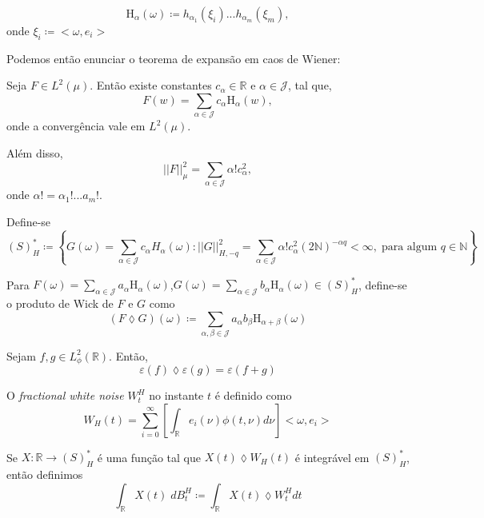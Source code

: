 \documentclass{article}
\begin{document}
$$\text{H}_\alpha(\omega) \coloneq h_{\alpha_1}(\xi_i)...h_{\alpha_m}(\xi_m),$$
onde $\xi_i \coloneq <\omega,e_i>$

\vspace{0.2cm}

Podemos então enunciar o teorema de expansão em caos de Wiener: 

\begin{thm}
    Seja $F \in L^2(\mu)$. Então existe constantes $c_\alpha \in \mathbb{R}$ e $\alpha \in \mathcal{J}$, tal que,
    $$F(w)=\sum_{\alpha \in \mathcal{J}}c_\alpha \text{H}_\alpha(w),$$
    onde a convergência vale em $L^2(\mu)$.
    
    \vspace{0.3cm}
    
    Além disso,
    $$||F||^2_\mu=\sum_{\alpha \in \mathcal{J}}\alpha!c_\alpha^2,$$
    onde $\alpha!=\alpha_1!...a_m!$.
\end{thm}

\begin{dfn}
    Define-se 
    $$(S)^*_H \coloneq \left\{G(\omega) = \sum_{\alpha \in \mathcal{J}}c_\alpha H_\alpha(\omega) : ||G||^2_{H,-q}=\sum_{\alpha \in \mathcal{J}}\alpha!c_\alpha^2(2\mathbb{N})^{-\alpha q} < \infty,\;\text{para algum } q \in \mathbb{N}  \right\}$$
\end{dfn}

\begin{dfn}
    Para $F(\omega)=\sum_{\alpha \in \mathcal{J}}a_\alpha \text{H}_\alpha(\omega)$,$G(\omega)=\sum_{\alpha \in \mathcal{J}}b_\alpha \text{H}_\alpha(\omega) \in (S)^*_H$, define-se o produto de Wick de $F$ e $G$ como
    $$(F \lozenge G)(\omega) \coloneq \sum_{\alpha, \beta \in \mathcal{J}}a_\alpha b_\beta \text{H}_{\alpha+\beta}(\omega)$$
\end{dfn}

\begin{prop}
    Sejam $f,g \in L^2_\phi(\mathbb{R})$. Então,
    $$\varepsilon(f) \lozenge \varepsilon(g)=\varepsilon(f+g)$$
\end{prop}

\begin{dfn}
    O \textit{fractional white noise} $W^H_t$ no instante $t$ é definido como 
    $$W_H(t)= \sum_{i=0}^\infty \left[ \int_\mathbb{R}e_i(\nu)\phi(t,\nu)d\nu\right]<\omega, e_i>$$
\end{dfn}

\begin{dfn}
    Se $X : \mathbb{R}  \rightarrow (S)^*_H$ é uma função tal que $X(t) \lozenge W_H(t)$ é integrável em $(S)^*_H$, então definimos
    $$\int_\mathbb{R}X(t)\;dB^H_t \coloneq \int_\mathbb{R} X(t) \lozenge W^H_t dt$$
\end{dfn}
\newpage
\end{document}
